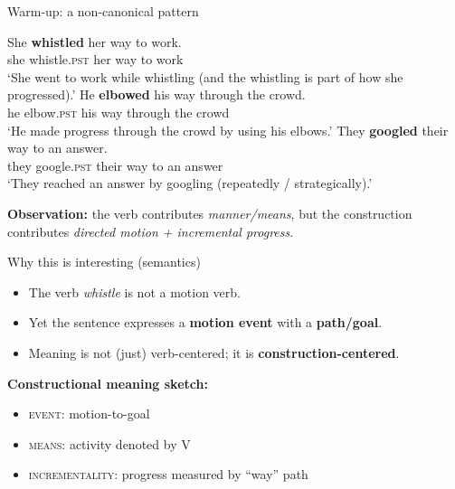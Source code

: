 \begin{frame}{Warm-up: a non-canonical pattern}
\small
\begin{exe}
  \ex \gll She \textbf{whistled} her way to work.\\
      she whistle.\textsc{pst} her way to work\\
      \glt `She went to work while whistling (and the whistling is part of how she progressed).'
  \ex \gll He \textbf{elbowed} his way through the crowd.\\
      he elbow.\textsc{pst} his way through the crowd\\
      \glt `He made progress through the crowd by using his elbows.'
  \ex \gll They \textbf{googled} their way to an answer.\\
      they google.\textsc{pst} their way to an answer\\
      \glt `They reached an answer by googling (repeatedly / strategically).'
\end{exe}


\vspace{0.5em}
\textbf{Observation:} the verb contributes \emph{manner/means}, but the construction contributes \emph{directed motion + incremental progress}.
\end{frame}

\begin{frame}{Why this is interesting (semantics)}
\small
\begin{itemize}
  \item The verb \emph{whistle} is not a motion verb.
  \item Yet the sentence expresses a \textbf{motion event} with a \textbf{path/goal}.
  \item Meaning is not (just) verb-centered; it is \textbf{construction-centered}.
\end{itemize}

\vspace{0.75em}
\textbf{Constructional meaning sketch:}
\begin{itemize}
  \item \textsc{event}: motion-to-goal
  \item \textsc{means}: activity denoted by V
  \item \textsc{incrementality}: progress measured by ``way'' path
\end{itemize}
\end{frame}

